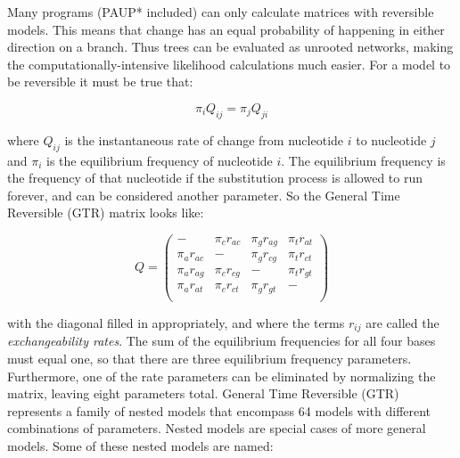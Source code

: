 \documentclass[11pt]{article}
\begin{document}
Many programs (PAUP* included) can only calculate matrices with reversible models.  This means that change has an equal probability of happening in either direction on a branch.  Thus trees can be evaluated as unrooted networks, making the computationally-intensive likelihood calculations much easier.  For a model to be reversible it must be true that:

\begin{equation*}
\pi_i Q_{ij} = \pi_j Q_{ji}
\end{equation*}

where $Q_{ij}$ is the instantaneous rate of change from nucleotide $i$ to nucleotide $j$
and $\pi_i$ is the equilibrium frequency of nucleotide $i$.
The equilibrium frequency is the frequency of that nucleotide if the substitution process is allowed to run forever, and can be considered another parameter.
So the General Time Reversible (GTR) matrix looks like:

\[ Q = \left( \begin{array}{cccc}
-  &  \pi_c r_{ac}  &  \pi_g r_{ag}  &  \pi_t r_{at}  \\ 
\pi_a r_{ac}  &  -  &  \pi_g r_{cg}  &  \pi_t r_{ct}  \\ 
\pi_a r_{ag}  &  \pi_c r_{cg}  &  -  &  \pi_t r_{gt}  \\ 
\pi_a r_{at}  &  \pi_c r_{ct}  &  \pi_g r_{gt}  &  -  \\ 
\end{array} \right)\]

with the diagonal filled in appropriately, and where the terms $r_{ij}$ are called the \textit{exchangeability rates}.  The sum of the equilibrium frequencies for all four bases must equal one, so that there are three equilibrium frequency parameters.  Furthermore, one of the rate parameters can be eliminated by normalizing the matrix, leaving eight parameters total.  General Time Reversible (GTR) represents a family of nested models that encompass 64 models with different combinations of parameters.  Nested models are special cases of more general models.  
Some of these nested models are named:
\end{document}
